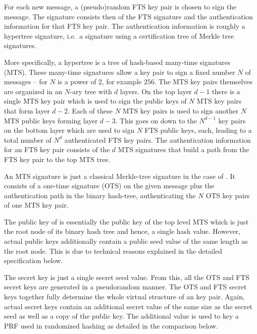 For each new message, a (pseudo)random FTS key pair is chosen to sign the message.
The signature consists then of the FTS signature and the authentication 
information for that FTS key pair. The authentication information is roughly a 
hypertree signature, i.e.~a signature using a certification tree of Merkle tree 
signatures. 

More specifically, a hypertree is a tree of hash-based many-time signatures (MTS). 
These many-time signatures allow a key pair to sign a fixed number $N$ of 
messages -- for \spx $N$ is a power of 2, for example $256$. The MTS 
key pairs themselves are organized in an $N$-ary tree with $d$ layers. On the 
top layer $d-1$ there is a single MTS key pair which is used to sign the public keys of
$N$ MTS key pairs that form layer $d-2$. Each of these $N$ MTS key pairs is used
to sign another $N$ MTS public keys forming layer $d-3$. This goes on down to the 
$N^{d-1}$ key pairs on the bottom layer which are used to sign $N$ FTS public 
keys, each, leading to a total number of $N^d$ authenticated FTS key pairs. The
authentication information for an FTS key pair consists of the $d$ MTS 
signatures that build a path from the FTS key pair to the top MTS tree.

An MTS signature is just a classical Merkle-tree signature in the case of \spx.
It consists of a one-time signature (OTS) on the given message plus the authentication
path in the binary hash-tree, authenticating the $N$ OTS key pairs of one MTS key 
pair. 

The public key of \spx is essentially the public key of the top level MTS which
is just the root node of its binary hash tree and hence, a single hash value. 
However, actual \spx public keys additionally contain a public seed value of the 
same length as the root node. This is due to technical reasons explained in the 
detailed specification below.

The \spx secret key is just a single secret seed value. From this, all the OTS 
and FTS secret keys are generated in a pseudorandom manner. The OTS and FTS
secret keys together fully determine the whole virtual structure of an \spx 
key pair. Again, actual \spx secret keys contain an additional secret value of 
the same size as the secret seed as well as a copy of the public key. The 
additional value is used to key a PRF 
used in randomized hashing as detailed in the comparison below.

